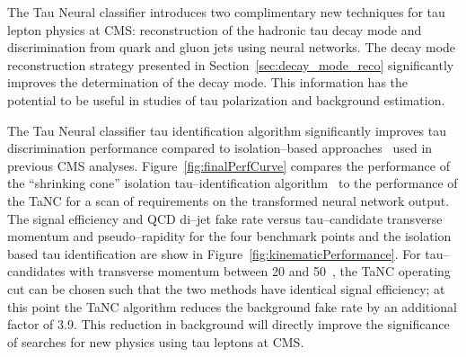 The Tau Neural classifier introduces two complimentary new techniques for tau
lepton physics at CMS: reconstruction of the hadronic tau decay mode and
discrimination from quark and gluon jets using neural networks.  The decay mode
reconstruction strategy presented in Section~\ref{sec:decay_mode_reco}
significantly improves the determination of the decay mode. This information has
the potential to be useful in studies of tau polarization and background
estimation.

The Tau Neural classifier tau identification algorithm significantly improves
tau discrimination performance compared to isolation--based
approaches~\cite{CMS-PAS-PFT-08-001} used in previous CMS analyses.
Figure~\ref{fig:finalPerfCurve} compares the performance of the ``shrinking
cone'' isolation tau--identification algorithm~\cite{CMS-PAS-PFT-08-001} to the
performance of the TaNC for a scan of requirements on the transformed neural
network output.  The signal efficiency and QCD di--jet fake rate versus
tau--candidate transverse momentum and pseudo--rapidity for the four benchmark
points and the isolation based tau identification are show in
Figure~\ref{fig:kinematicPerformance}.  For tau--candidates with transverse
momentum between 20 and 50~\GeVc, the TaNC operating cut can be chosen such that
the two methods have identical signal efficiency; at this point the TaNC
algorithm reduces the background fake rate by an additional factor of 3.9.  This
reduction in background will directly improve the significance of searches for
new physics using tau leptons at CMS.


